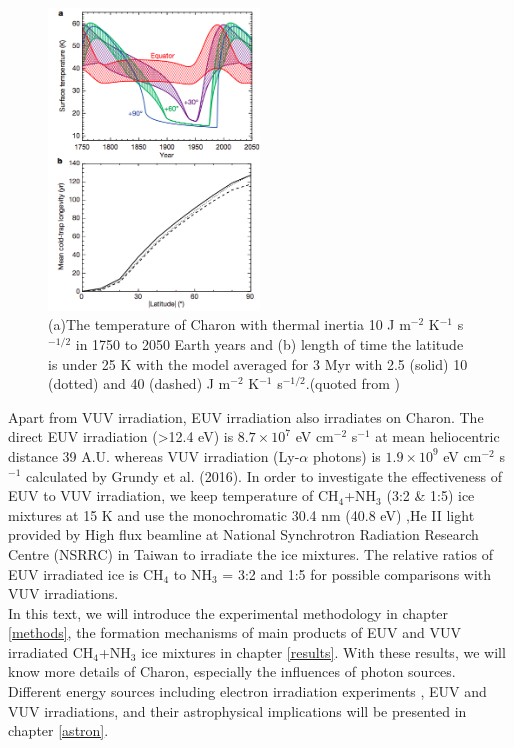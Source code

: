 \begin{figure}
\centering
\includegraphics[width=0.5\textwidth]{figures/chapter1/thermal.png}
\caption{(a)The temperature of Charon with thermal inertia 10 J m$^{-2}$ K$^{-1}$ s$^{-1/2}$ in 1750 to 2050 Earth years and (b) length of time the latitude is under 25 K with the model averaged for 3 Myr with 2.5 (solid) 10 (dotted) and 40 (dashed) J m$^{-2}$ K$^{-1}$ s$^{-1/2}$.(quoted from \cite{grundy2016formation})}
\label{fig:Charon_thermal}
\end{figure}

Apart from VUV irradiation, EUV irradiation also irradiates on Charon. The direct EUV irradiation (>12.4 eV) is $8.7 \times 10^7$ eV cm$^{-2}$ s$^{-1}$ at mean heliocentric distance 39 A.U. whereas VUV irradiation (Ly-$\alpha$ photons) is $1.9 \times 10^9$ eV cm$^{-2}$ s$^{-1}$ calculated by Grundy et al. (2016)\cite{grundy2016formation}. In order to investigate the effectiveness of EUV to VUV irradiation, we keep temperature of CH$_4$+NH$_3$ (3:2 \& 1:5) ice mixtures at 15 K and use the monochromatic 30.4 nm (40.8 eV) ,He II light provided by High flux beamline at National Synchrotron Radiation Research Centre (NSRRC) in Taiwan to irradiate the ice mixtures. The relative ratios of EUV irradiated ice is CH$_4$ to NH$_3$ = 3:2 and 1:5 for possible comparisons with VUV irradiations. \\

In this text, we will introduce the experimental methodology in chapter \ref{methods}, the formation mechanisms of main products of  EUV and VUV irradiated CH$_4$+NH$_3$ ice mixtures in chapter \ref{results}. With these results, we will know more details of Charon, especially the influences of photon sources. Different energy sources including electron irradiation experiments , EUV and VUV irradiations, and their astrophysical implications will be presented in chapter \ref{astron}.\\
